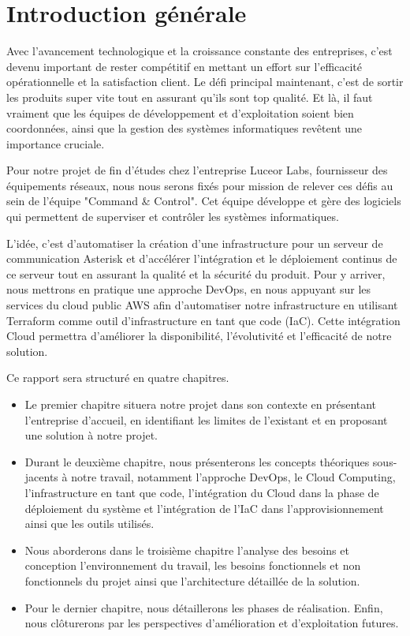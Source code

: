\chapter*{Introduction générale}

Avec l'avancement technologique et la croissance constante des entreprises, c'est devenu important de rester compétitif en mettant un effort sur l'efficacité opérationnelle et la satisfaction client. Le défi principal maintenant, c'est de sortir les produits super vite tout en assurant qu'ils sont top qualité. Et là, il faut vraiment que les équipes de développement et d’exploitation soient bien coordonnées, ainsi que la gestion des systèmes informatiques revêtent une importance cruciale.
\vskip 0.3cm

Pour notre projet de fin d'études chez l'entreprise Luceor Labs, fournisseur des équipements réseaux, nous nous serons fixés pour mission de relever ces défis au sein de l'équipe "Command & Control". Cet équipe développe et gère des logiciels qui permettent de superviser et contrôler les systèmes informatiques.
\vskip 0.3cm

L'idée, c'est d'automatiser la création d'une infrastructure pour un serveur de communication Asterisk et d'accélérer l'intégration et le déploiement continus de ce serveur tout en assurant la qualité et la sécurité du produit. Pour y arriver, nous mettrons en pratique une approche DevOps, en nous appuyant sur les services du cloud public AWS afin d'automatiser notre infrastructure en utilisant Terraform comme outil d'infrastructure en tant que code (IaC). Cette intégration Cloud permettra d'améliorer la disponibilité, l'évolutivité et l'efficacité de notre solution.
\vskip 0.3cm

Ce rapport sera structuré en quatre chapitres. 
\begin{itemize}
\item Le premier chapitre situera notre projet dans son contexte en présentant l'entreprise d'accueil, en identifiant les limites de l'existant et en proposant une solution à notre projet. 
\item Durant le deuxième chapitre, nous présenterons les concepts théoriques sous-jacents à notre travail, notamment l'approche DevOps, le Cloud Computing, l'infrastructure en tant que code, l'intégration du Cloud dans la phase de déploiement du système et l'intégration de l'IaC dans l'approvisionnement ainsi que les outils utilisés. 
\item Nous aborderons dans le troisième chapitre l'analyse des besoins et conception l'environnement du travail, les besoins fonctionnels et non fonctionnels du projet ainsi que l'architecture détaillée de la solution. 
\item Pour le dernier chapitre, nous détaillerons les phases de réalisation. Enfin, nous clôturerons par les perspectives d'amélioration et d'exploitation futures.
\end{itemize}
